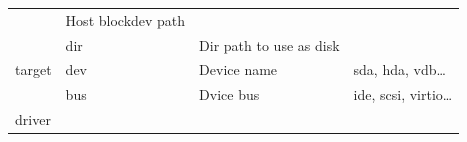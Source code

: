 \documentclass[
  14pt,
  english,
  a4paper,
]{scrreprt}
\begin{document}
\begin{longtable}[]{@{}llll@{}}
\begin{minipage}[t]{0.14\columnwidth}
\end{minipage} & \begin{minipage}[t]{0.31\columnwidth}\raggedright
Host blockdev path\strut
\end{minipage} & \begin{minipage}[t]{0.28\columnwidth}\raggedright
\strut
\end{minipage}\tabularnewline
\begin{minipage}[t]{0.16\columnwidth}\raggedright
\strut
\end{minipage} & \begin{minipage}[t]{0.14\columnwidth}\raggedright
dir\strut
\end{minipage} & \begin{minipage}[t]{0.31\columnwidth}\raggedright
Dir path to use as disk\strut
\end{minipage} & \begin{minipage}[t]{0.28\columnwidth}\raggedright
\strut
\end{minipage}\tabularnewline
\begin{minipage}[t]{0.16\columnwidth}\raggedright
target\strut
\end{minipage} & \begin{minipage}[t]{0.14\columnwidth}\raggedright
dev\strut
\end{minipage} & \begin{minipage}[t]{0.31\columnwidth}\raggedright
Device name\strut
\end{minipage} & \begin{minipage}[t]{0.28\columnwidth}\raggedright
sda, hda, vdb\ldots{}\strut
\end{minipage}\tabularnewline
\begin{minipage}[t]{0.16\columnwidth}\raggedright
\strut
\end{minipage} & \begin{minipage}[t]{0.14\columnwidth}\raggedright
bus\strut
\end{minipage} & \begin{minipage}[t]{0.31\columnwidth}\raggedright
Dvice bus\strut
\end{minipage} & \begin{minipage}[t]{0.28\columnwidth}\raggedright
ide, scsi, virtio\ldots{}\strut
\end{minipage}\tabularnewline
\begin{minipage}[t]{0.16\columnwidth}\raggedright
driver\strut
\end{minipage} & \begin{minipage}[t]{0.14\columnwidth}\raggedright

\end{minipage}
\end{longtable}
\end{document}
